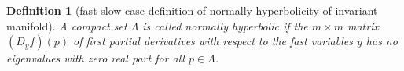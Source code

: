 \documentclass[a4paper,11pt]{article}
\newtheorem{theorem}{Theorem}
\newtheorem{definition}{Definition}[section]
\begin{document}
\begin{definition}[fast-slow case definition of normally hyperbolicity of invariant manifold]
A compact set $\Lambda$ is called normally hyperbolic if the $m\times m$ matrix $(D_y f)(p)$ of first partial derivatives with respect to the fast variables $y$ has no eigenvalues with zero real part for all $p \in \Lambda$.
\end{definition}
% 
% 
% 
\end{document}
